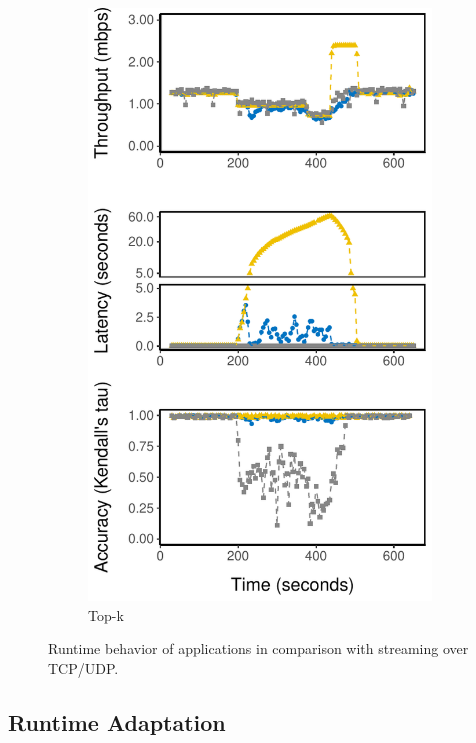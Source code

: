 \begin{figure}
\begin{subfigure}{0.3\textwidth}
    \includegraphics[width=\textwidth]{figures/runtime-topk-verticle.pdf}
    \caption{Top-k}
    \label{fig:tk-runtime}
  \end{subfigure}
  \caption{Runtime behavior of \sysname{} applications in comparison with
    streaming over TCP/UDP.}
  \label{fig:all-runtime}
\end{figure}

\newpage

\subsection{Runtime Adaptation}
\label{sec:runtime-adaptation}

